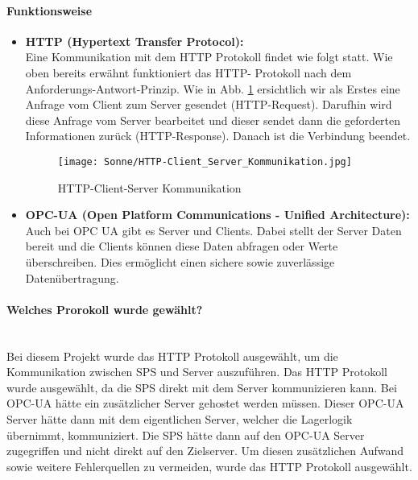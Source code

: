     \paragraph{Funktionsweise}

            \begin{itemize}
                \item \textbf{{HTTP (Hypertext Transfer Protocol):}} \mbox{} \\
                Eine Kommunikation mit dem HTTP Protokoll findet wie folgt statt. Wie oben bereits erwähnt funktioniert das HTTP- Protokoll nach dem Anforderungs-Antwort-Prinzip. Wie in Abb. \ref{HTTP-Client_Server_Kommunikation} ersichtlich wir als Erstes eine Anfrage vom Client zum Server gesendet (HTTP-Request). Darufhin wird diese Anfrage vom Server bearbeitet und dieser sendet dann die geforderten Informationen zurück (HTTP-Response). Danach ist die Verbindung beendet.
                \cite{HTTP-Client_Server_Kommunikation}

                \begin{figure}[h]
                    \centering
                    \texttt{[image: Sonne/HTTP-Client\_Server\_Kommunikation.jpg]}
                    \caption{HTTP-Client-Server Kommunikation 
                    \cite{HTTP-Client_Server_Kommunikation}}
                    \label{HTTP-Client_Server_Kommunikation}
                \end{figure}
            
                \item \textbf{{OPC-UA (Open Platform Communications - Unified Architecture):}} \mbox{} \\
                Auch bei OPC UA gibt es Server und Clients. Dabei stellt der Server Daten bereit und die Clients können diese Daten abfragen oder Werte überschreiben. Dies ermöglicht einen sichere sowie zuverlässige Datenübertragung. 
                \cite{OPC-UA}
            \end{itemize}

            
    \paragraph{Welches Prorokoll wurde gewählt?} \mbox{} \\
    Bei diesem Projekt wurde das HTTP Protokoll ausgewählt, um die Kommunikation zwischen SPS und Server auszuführen. Das HTTP Protokoll wurde ausgewählt, da die SPS direkt mit dem Server kommunizieren kann. Bei OPC-UA hätte ein zusätzlicher Server gehostet werden müssen. Dieser OPC-UA Server hätte dann mit dem eigentlichen Server, welcher die Lagerlogik übernimmt, kommuniziert. Die SPS hätte dann auf den OPC-UA Server zugegriffen und nicht direkt auf den Zielserver. Um diesen zusätzlichen Aufwand sowie weitere Fehlerquellen zu vermeiden, wurde das HTTP Protokoll ausgewählt.
        
